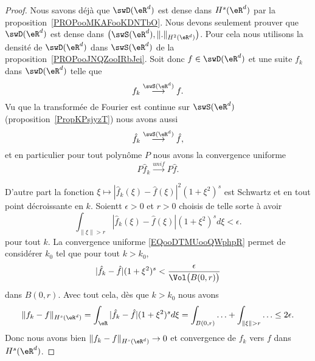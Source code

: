 \begin{proof}
    Nous savons déjà que \( \swD(\eR^d)\) est dense dans \( H^s(\eR^d)\) par la proposition~\ref{PROPooMKAFooKDNTbO}. Nous devons seulement prouver que \( \swD(\eR^d)\) est dense dans \( \big( \swS(\eR^d),\| . \|_{H^2(\eR^d)} \big)\). Pour cela nous utilisons la densité de \( \swD(\eR^d)\) dans \( \swS(\eR^d)\) de la proposition~\ref{PROPooJNQZooIRbJei}. Soit donc \( f\in\swD(\eR^d)\) et une suite \( f_k\) dans \( \swD(\eR^d)\) telle que
    \begin{equation}
        f_k\stackrel{\swS(\eR^d)}{\longrightarrow}f.
    \end{equation}
    Vu que la transformée de Fourier est continue sur \( \swS(\eR^d)\) (proposition~\ref{PropKPsjyzT}) nous avons aussi
    \begin{equation}
        \hat f_k\stackrel{\swS(\eR^d)}{\longrightarrow}\hat f,
    \end{equation}
    et en particulier pour tout polynôme \( P\) nous avons la convergence uniforme
    \begin{equation}        \label{EQooDTMUooQWphpR}
        P\hat f_k\stackrel{unif}{\longrightarrow}P\hat f.
    \end{equation}

    D'autre part la fonction \( \xi\mapsto | \hat f_k(\xi)-\hat f(\xi) |^2(1+\xi^2)^s\) est Schwartz et en tout point décroissante en \( k\). Soientt \( \epsilon>0\) et \( r>0\) choisis de telle sorte à avoir
    \begin{equation}
        \int_{\| \xi \|>r}| \hat f_{k}(\xi)-\hat f(\xi) |(1+\xi^2)^sd\xi<\epsilon.
    \end{equation}
    pour tout \( k\). La convergence uniforme \eqref{EQooDTMUooQWphpR} permet de considérer \( k_0\) tel que  pour tout \( k>k_0\),
    \begin{equation}
        | \hat f_k-\hat f |(1+\xi^2)^s< \frac{ \epsilon }{ \Vol\big( B(0,r) \big) }
    \end{equation}
    dans \( B(0,r)\). Avec tout cela, dès que \( k>k_0\) nous avons
    \begin{equation}
        \| f_k-f \|_{H^s(\eR^d)}=\int_{\eR}| \hat f_k-\hat f |(1+\xi^2)^sd\xi=\int_{B(0,r)}\ldots +\int_{\| \xi \|>r}\ldots\leq 2\epsilon.
    \end{equation}
    Donc nous avons bien \( \| f_k-f \|_{H^s(\eR^d)}\to 0\) et convergence de \( f_k\) vers \( f\) dans \( H^s(\eR^d)\).
\end{proof}

